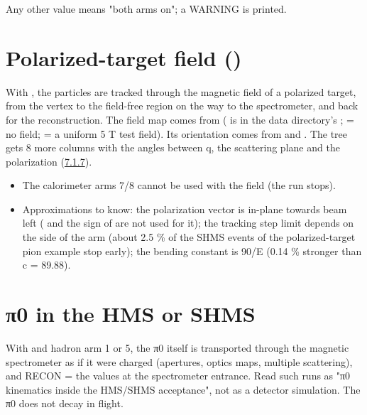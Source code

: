 Any other value means "both arms on"; a WARNING is printed.

\section{\texorpdfstring{Polarized-target field ()}{Polarized-target field (using\_\allowbreak{}tgt\_\allowbreak{}field)}}\label{user_manual-06u5fspectrometers:65-polarized-target-field-usingu5ftgtu5ffield}
With , the particles are tracked through the magnetic field of a polarized target, from the vertex
to the field-free region on the way to the spectrometer,\allowbreak{} and back for the reconstruction. The field map comes from
\hyperref[param:tgtu5ffieldu5ffile]{} ( is in the data directory's ;  = no field;  = a uniform 5 T test
field). Its orientation comes from \hyperref[param:targu5fBangle]{} and \hyperref[param:targu5fBphi]{}. The tree gets 8 more columns with the angles between q,
the scattering plane and the polarization (\hyperref[user_manual-07u5foutputs:718-polarized-target-columns-usingu5ftgtu5ffield]{7.1.7}).

\begin{itemize}
\item The calorimeter arms 7/8 cannot be used with the field (the run stops).
\item Approximations to know: the polarization vector is in-plane towards beam left (\hyperref[param:targu5fBphi]{} and the sign of \hyperref[param:targu5fBangle]{}
are not used for it); the tracking step limit depends on the side of the arm (about 2.5 \% of the SHMS events of the
polarized-target pion example stop early); the bending constant is 90/E (0.14 \% stronger than c = 89.88).
\end{itemize}
\section{\texorpdfstring{π0 in the HMS or SHMS}{π0 in the HMS or SHMS}}\label{user_manual-06u5fspectrometers:66-u3c00-in-the-hms-or-shms}
With \hyperref[param:doingu5fpizero]{} and hadron arm 1 or 5, the π0 itself is transported through the magnetic spectrometer as if it were
charged (apertures, optics maps, multiple scattering),\allowbreak{} and RECON = the values at the spectrometer entrance. Read such runs
as "π0 kinematics inside the HMS/SHMS acceptance",\allowbreak{} not as a detector simulation. The π0 does not decay in flight.

